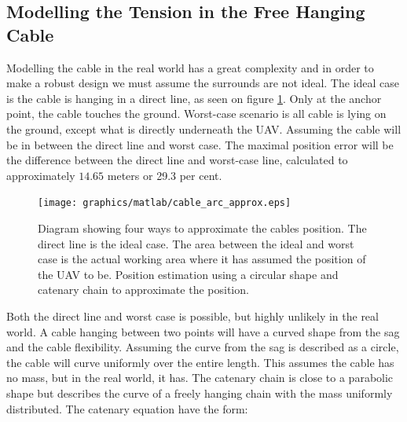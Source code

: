    

\subsection{Modelling the Tension in the Free Hanging Cable}
Modelling the cable in the real world has a great complexity and in order to make a robust design we must assume the surrounds are not ideal. The ideal case is the cable is hanging in a direct line, as seen on figure \ref{fig:cable_model_cases}. Only at the anchor point, the cable touches the ground. Worst-case scenario is all cable is lying on the ground, except what is directly underneath the UAV. Assuming the cable will be in between the direct line and worst case. The maximal position error will be the difference between the direct line and worst-case line, calculated to approximately $14.65$ meters or 29.3 per cent.

\newpage

\begin{figure}[H]
\centering
\texttt{[image: graphics/matlab/cable\_arc\_approx.eps]}
\caption[Diagram showing four ways of approximate the cables position.]{Diagram showing four ways to approximate the cables position. The direct line is the ideal case. The area between the ideal and worst case is the actual working area where it has assumed the position of the UAV to be. Position estimation using a circular shape and catenary chain to approximate the position.}
\label{fig:cable_model_cases}
\end{figure}

\noindent
Both the direct line and worst case is possible, but highly unlikely in the real world. A cable hanging between two points will have a curved shape from the sag and the cable flexibility. Assuming the curve from the sag is described as a circle, the cable will curve uniformly over the entire length. This assumes the cable has no mass, but in the real world, it has.
The catenary chain is close to a parabolic shape but describes the curve of a freely hanging chain with the mass uniformly distributed\cite{Whewelll1833}. The catenary equation have the form:

